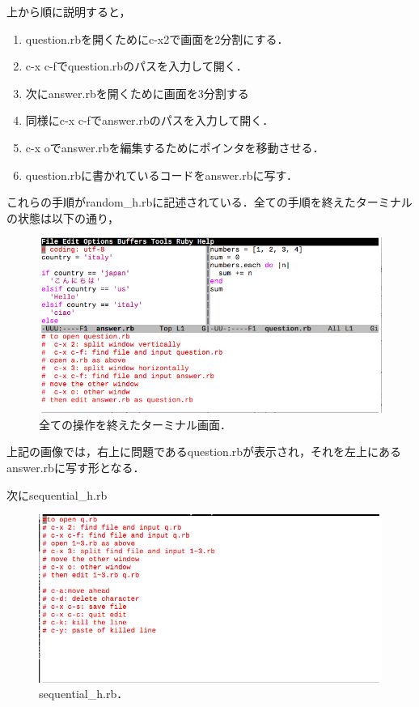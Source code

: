 上から順に説明すると，
\begin{enumerate}
\def\labelenumi{\arabic{enumi}.}
\tightlist
\item
question.rbを開くためにc-x2で画面を2分割にする．
\item
c-x c-fでquestion.rbのパスを入力して開く． 
\item
次にanswer.rbを開くために画面を3分割する 
\item
同様にc-x c-fでanswer.rbのパスを入力して開く． 
\item
c-x oでanswer.rbを編集するためにポインタを移動させる． 
\item
question.rbに書かれているコードをanswer.rbに写す．
\end{enumerate}
これらの手順がrandom\_h.rbに記述されている．全ての手順を終えたターミナルの状態は以下の通り，

\begin{figure}[H]
\centering
\begin{center}
\includegraphics[width=150mm]{../../picture/split.png}
\end{center}
\caption{全ての操作を終えたターミナル画面．\label{split}}

\label{fig:}
\end{figure}

上記の画像では，右上に問題であるquestion.rbが表示され，それを左上にあるanswer.rbに写す形となる．

次にsequential\_h.rb

\begin{figure}[H]
\centering
\begin{center}
\includegraphics[width=150mm]{../../picture/sequential_h.png}
\end{center}
\caption{sequential\_h.rb．\label{sqquential}}

\label{fig:}
\end{figure}

